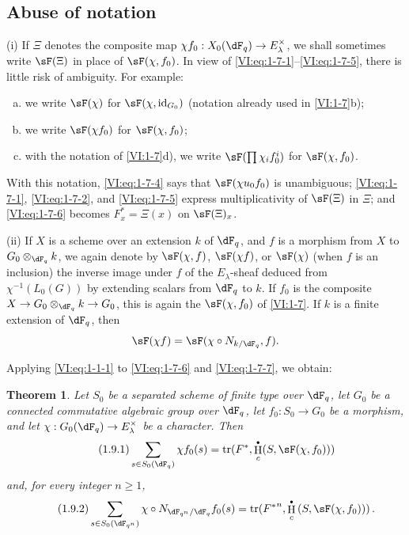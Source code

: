 \documentclass[12pt,oneside,english]{smfbook}
\DeclareMathOperator{\h}{H}
\DeclareMathOperator{\tr}{tr}
\newcounter{char}
\newtheorem{theorem_}[subsection]{Theorem}
\let\oldbullet\bullet
\renewcommand{\bullet}{\textnormal{\tiny$\oldbullet$}}
\begin{document}
\subsection{Abuse of notation}\label{VI:1-8}

(i) If $\Xi$ denotes the composite map $\chi f_0:X_0(\dF_q)\to E_\lambda^\times$, we shall sometimes write $\sF(\Xi)$ in place of $\sF(\chi,f_0)$. In view of \eqref{VI:eq:1-7-1}--\eqref{VI:eq:1-7-5}, there is little risk of ambiguity. For example:
\begin{enumerate}[a)]
  \item we write $\sF(\chi)$ for $\sF(\chi,\operatorname{id}_{G_0})$ (notation already used in \ref{VI:1-7}b);
  \item we write $\sF(\chi f_0)$ for $\sF(\chi,f_0)$;
  \item with the notation of \ref{VI:1-7}d), we write $\sF(\prod\chi_i f_0^i)$ for $\sF(\chi,f_0)$.
\end{enumerate}

With this notation, \eqref{VI:eq:1-7-4} says that $\sF(\chi u_0f_0)$ is unambiguous; \eqref{VI:eq:1-7-1}, \eqref{VI:eq:1-7-2}, and \eqref{VI:eq:1-7-5} express multiplicativity of $\sF(\Xi)$ in $\Xi$; and \eqref{VI:eq:1-7-6} becomes $F_x^\ast=\Xi(x)$ on $\sF(\Xi)_x$.

(ii) If $X$ is a scheme over an extension $k$ of $\dF_q$, and $f$ is a morphism from $X$ to $G_0\otimes_{\dF_q}k$, we again denote by $\sF(\chi,f)$, $\sF(\chi f)$, or $\sF(\chi)$ (when $f$ is an inclusion) the inverse image under $f$ of the $E_\lambda$-sheaf deduced from $\chi^{-1}(L_0(G))$ by extending scalars from $\dF_q$ to $k$. If $f_0$ is the composite $X\to G_0\otimes_{\dF_q}k\to G_0$, this is again the $\sF(\chi,f_0)$ of \ref{VI:1-7}. If $k$ is a finite extension of $\dF_q$, then
\[
  \sF(\chi f)=\sF(\chi\circ N_{k/\dF_q},f) \text{.}
\]

Applying \eqref{VI:eq:1-1-1} to \eqref{VI:eq:1-7-6} and \eqref{VI:eq:1-7-7}, we obtain:

\begin{theorem_}\label{VI:1-9}
Let $S_0$ be a separated scheme of finite type over $\dF_q$, let $G_0$ be a connected commutative algebraic group over $\dF_q$, let $f_0:S_0\to G_0$ be a morphism, and let $\chi:G_0(\dF_q)\to E_\lambda^\times$ be a character. Then
\begin{equation*}\tag{1.9.1}\label{VI:eq:1-9-1}
  \sum_{s\in S_0(\dF_q)} \chi f_0(s) = \tr(F^\ast,\h_c^\bullet(S,\sF(\chi,f_0)))
\end{equation*}
and, for every integer $n\geqslant1$,
\begin{equation*}\tag{1.9.2}\label{VI:eq:1-9-2}
  \sum_{s\in S_0(\dF_{q^n})} \chi\circ N_{\dF_{q^n}/\dF_q} f_0(s) = \tr({F^\ast}^n, \h_c^\bullet\left(S,\sF(\chi,f_0))\right) \text{.}
\end{equation*}
\end{theorem_}
\end{document}
